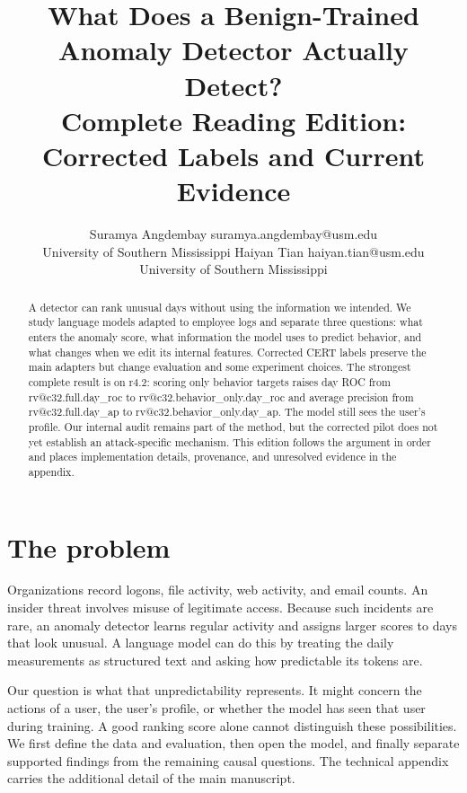 \documentclass[10pt]{article}
\title{What Does a Benign-Trained Anomaly Detector Actually Detect?\\Complete Reading Edition: Corrected Labels and Current Evidence}
\author{\name Suramya Angdembay \email suramya.angdembay@usm.edu\\\addr University of Southern Mississippi
\AND\name Haiyan Tian \email haiyan.tian@usm.edu\\\addr University of Southern Mississippi}
\makeatletter
\newcommand{\rv}[1]{\csname rv@#1\endcsname}
\makeatother
\begin{document}
\maketitle
\begin{abstract}
A detector can rank unusual days without using the information we intended.
We study language models adapted to employee logs and separate three questions:
what enters the anomaly score, what information the model uses to predict
behavior, and what changes when we edit its internal features. Corrected CERT
labels preserve the main adapters but change evaluation and some experiment
choices. The strongest complete result is on r4.2: scoring only behavior targets
raises day ROC from \rv{c32.full.day_roc} to \rv{c32.behavior_only.day_roc} and average precision from \rv{c32.full.day_ap} to \rv{c32.behavior_only.day_ap}.
The model still sees the user's profile. Our internal audit remains part of the
method, but the corrected pilot does not yet establish an attack-specific
mechanism. This edition follows the argument in order and places implementation
details, provenance, and unresolved evidence in the appendix.
\end{abstract}
\section{The problem}
Organizations record logons, file activity, web activity, and email counts.
An insider threat involves misuse of legitimate access. Because such incidents
are rare, an anomaly detector learns regular activity and assigns larger scores
to days that look unusual. A language model can do this by treating the daily
measurements as structured text and asking how predictable its tokens are.

Our question is what that unpredictability represents. It might concern the
actions of a user, the user's profile, or whether the model has seen that user
during training. A good ranking score alone cannot distinguish these
possibilities. We first define the data and evaluation, then open the model,
and finally separate supported findings from the remaining causal questions.
The technical appendix carries the additional detail of the main manuscript.






\appendix



\end{document}
